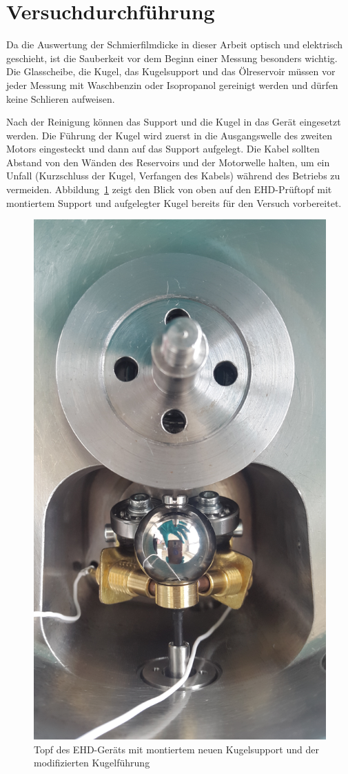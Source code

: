 \section{Versuchdurchführung}
\label{sec:versuchdurchfuehrung}

Da die Auswertung der Schmierfilmdicke in dieser Arbeit optisch und elektrisch geschieht, ist die Sauberkeit vor dem Beginn einer Messung besonders wichtig.
Die Glasscheibe, die Kugel, das Kugelsupport und das Ölreservoir müssen vor jeder Messung mit Waschbenzin oder Isopropanol gereinigt werden und dürfen keine Schlieren aufweisen.

Nach der Reinigung können das Support und die Kugel in das Gerät eingesetzt werden.
Die Führung der Kugel wird zuerst in die Ausgangswelle des zweiten Motors eingesteckt und dann auf das Support aufgelegt.
Die Kabel sollten Abstand von den Wänden des Reservoirs und der Motorwelle halten, um ein Unfall (Kurzschluss der Kugel, Verfangen des Kabels) während des Betriebs zu vermeiden.
Abbildung~\ref{fig:ehd_topf_mit_kugel_und_support} zeigt den Blick von oben auf den EHD-Prüftopf mit montiertem Support und aufgelegter Kugel bereits für den Versuch vorbereitet.

\begin{figure}[htb]
    \centering
    \includegraphics[width=0.7\linewidth]{./images/ehd_topf_mit_kugel_und_support.jpg}
    \caption{Topf des EHD-Geräts mit montiertem neuen Kugelsupport und der modifizierten Kugelführung}
    \label{fig:ehd_topf_mit_kugel_und_support}
\end{figure}

